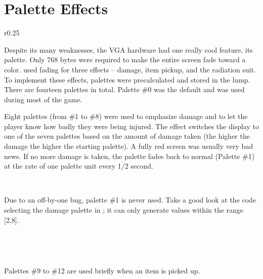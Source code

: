 \section{Palette Effects}
\label{label_palettes} \label{doom_palette}
\begin{wrapfigure}[8]{r}{0.25\textwidth}
\centering
{}
\end{wrapfigure}

Despite its many weaknesses, the VGA hardware had one really cool feature, its palette. Only 768 bytes were required to make the entire screen fade toward a color. \doom{} used fading for three effects -- damage, item pickup, and the radiation suit. To implement these effects, palettes were precalculated and stored in the  lump. There are fourteen palettes in total. Palette \#0 was the default and was used during most of the game.\\
\par
Eight palettes (from \#1 to \#8) were used to emphasize damage and to let the player know how badly they were being injured. The effect switches the display to one of the seven palettes based on the amount of damage taken (the higher the damage the higher the starting palette). A fully red screen was usually very bad news. If no more damage is taken, the palette fades back to normal (Palette \#1) at the rate of one palette unit every 1/2 second.\\
\par
{}
\\
\par
Due to an off-by-one bug, palette \#1 is never used. Take a good look at the code selecting the damage palette in ; it can only generate values within the range [2,8].\\
\par
{}\\
\par
{}\\
\par
Palettes \#9 to \#12 are used briefly when an item is picked up.\\
\par
{}
